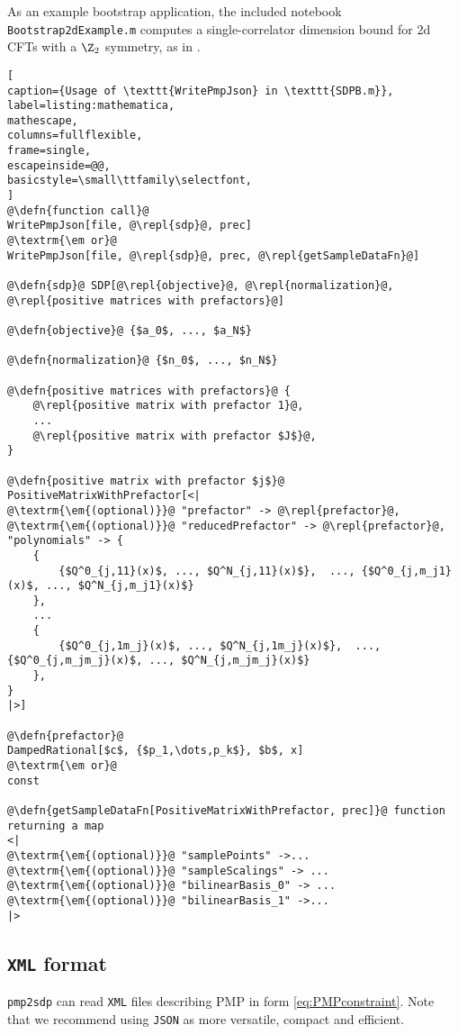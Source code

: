 \documentclass[12pt]{article}
\numberwithin{equation}{section}
\newcommand\repl[1]{$\langle$\textrm{\em #1}$\rangle$}
\newcommand\defn[1]{\textrm{\em #1}\ $\equiv$}
\begin{document}
As an example bootstrap application, the included notebook \texttt{Bootstrap2dExample.m} computes a single-correlator dimension bound for 2d CFTs with a $\Z_2$ symmetry, as in \cite{Rychkov:2009ij}.

\begin{lstlisting}[
caption={Usage of \texttt{WritePmpJson} in \texttt{SDPB.m}},
label=listing:mathematica,
mathescape,
columns=fullflexible,
frame=single,
escapeinside=@@,
basicstyle=\small\ttfamily\selectfont,
]
@\defn{function call}@
WritePmpJson[file, @\repl{sdp}@, prec]
@\textrm{\em or}@
WritePmpJson[file, @\repl{sdp}@, prec, @\repl{getSampleDataFn}@] 

@\defn{sdp}@ SDP[@\repl{objective}@, @\repl{normalization}@, @\repl{positive matrices with prefactors}@]

@\defn{objective}@ {$a_0$, ..., $a_N$}

@\defn{normalization}@ {$n_0$, ..., $n_N$}

@\defn{positive matrices with prefactors}@ {
	@\repl{positive matrix with prefactor 1}@,
	...
	@\repl{positive matrix with prefactor $J$}@,
}

@\defn{positive matrix with prefactor $j$}@
PositiveMatrixWithPrefactor[<|
@\textrm{\em{(optional)}}@ "prefactor" -> @\repl{prefactor}@,
@\textrm{\em{(optional)}}@ "reducedPrefactor" -> @\repl{prefactor}@,
"polynomials" -> {
	{
		{$Q^0_{j,11}(x)$, ..., $Q^N_{j,11}(x)$},  ..., {$Q^0_{j,m_j1}(x)$, ..., $Q^N_{j,m_j1}(x)$}
	},
	...
	{
		{$Q^0_{j,1m_j}(x)$, ..., $Q^N_{j,1m_j}(x)$},  ..., {$Q^0_{j,m_jm_j}(x)$, ..., $Q^N_{j,m_jm_j}(x)$}
	},
}
|>]

@\defn{prefactor}@
DampedRational[$c$, {$p_1,\dots,p_k$}, $b$, x]
@\textrm{\em or}@
const  

@\defn{getSampleDataFn[PositiveMatrixWithPrefactor, prec]}@ function returning a map
<|
@\textrm{\em{(optional)}}@ "samplePoints" ->...
@\textrm{\em{(optional)}}@ "sampleScalings" -> ...
@\textrm{\em{(optional)}}@ "bilinearBasis_0" -> ...
@\textrm{\em{(optional)}}@ "bilinearBasis_1" ->...
|>
\end{lstlisting}

\subsection{\texttt{XML} format}
\label{sec:xml}

\texttt{pmp2sdp} can read \texttt{XML} files describing PMP in form \eqref{eq:PMPconstraint}.
Note that we recommend using \texttt{JSON} as more versatile, compact and efficient.
\end{document}

